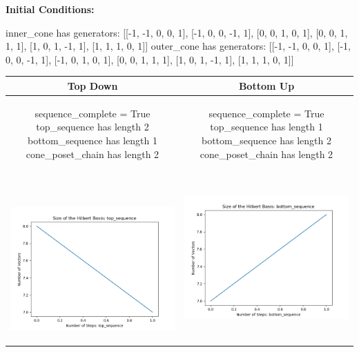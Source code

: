 \documentclass[10pt]{article}
\begin{document}
\textbf{Initial Conditions:}
\begin{SAGE}
inner_cone has generators: 
[[-1, -1, 0, 0, 1], [-1, 0, 0, -1, 1], [0, 0, 1, 0, 1], [0, 0, 1, 1, 1], [1, 0, 1, -1, 1], [1, 1, 1, 0, 1]]
outer_cone has generators: 
[[-1, -1, 0, 0, 1], [-1, 0, 0, -1, 1], [-1, 0, 1, 0, 1], [0, 0, 1, 1, 1], [1, 0, 1, -1, 1], [1, 1, 1, 0, 1]]

\end{SAGE}
\begin{tabular}{c|c}
\textbf{Top Down} & \textbf{Bottom Up} \\ \hline  
\begin{SAGE}
	sequence_complete = True
	top_sequence has length 2
	bottom_sequence has length 1
	cone_poset_chain has length 2
\end{SAGE} 
&
\begin{SAGE}
	sequence_complete = True
	top_sequence has length 1
	bottom_sequence has length 2
	cone_poset_chain has length 2
\end{SAGE} 
\\ \hline
\
\begin{minipage}{.45\textwidth}
\includegraphics[width=\textwidth]{"DATA/5d/6 generators 1 bound J/top_sequence SIZE"}
\end{minipage} &
\begin{minipage}{.45\textwidth}
\includegraphics[width=\textwidth]{"DATA/5d/6 generators 1 bound J bottomup/bottom_sequence SIZE"}

\end{minipage}
\end{tabular}
\end{document}

